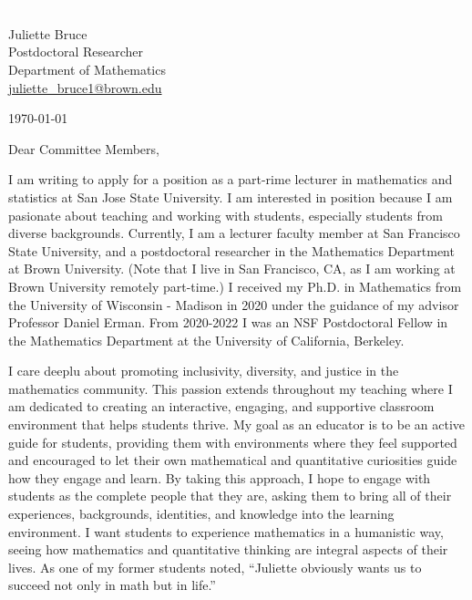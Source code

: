\documentclass[11pt]{article}
\begin{document}
\section*{}

\noindent
\begin{minipage}{0.99\textwidth}
\begin{minipage}{0.69\textwidth}
\textcolor{white}{.}
\end{minipage}
\begin{minipage}{0.29\textwidth}
{
Juliette Bruce \\
Postdoctoral Researcher \\
Department of Mathematics \\
\href{mailto:juliette\_bruce1@brown.edu}{juliette\_bruce1@brown.edu}
}

\vspace{12pt}
\today
\end{minipage}
\end{minipage}


\vspace{12pt}
\noindent
Dear Committee Members,

I am writing to apply for a position as a part-rime lecturer in mathematics and statistics at San Jose State University. I am interested in position because I am pasionate about teaching and working with students, especially students from diverse backgrounds. Currently, I am a lecturer faculty member at San Francisco State University, and a postdoctoral researcher in the Mathematics Department at Brown University. (Note that I live in San Francisco, CA, as I am working at Brown University remotely part-time.)  I received my Ph.D. in Mathematics from the University of Wisconsin - Madison in 2020 under the guidance of my advisor Professor Daniel Erman. From 2020-2022 I was an NSF Postdoctoral Fellow in the Mathematics Department at the University of California, Berkeley.

I care deeplu about promoting inclusivity, diversity, and justice in the mathematics community. This passion extends throughout my teaching where I am dedicated to creating an interactive, engaging, and supportive classroom environment that helps students thrive. My goal as an educator is to be an active guide for students, providing them with environments where they feel supported and encouraged to let their own mathematical and quantitative curiosities guide how they engage and learn. By taking this approach, I hope to engage with students as the complete people that they are, asking them to bring all of their experiences, backgrounds, identities, and knowledge into the learning environment. I want students to experience mathematics in a humanistic way, seeing how mathematics and quantitative thinking are integral aspects of their lives. As one of my former students noted, ``Juliette obviously wants us to succeed not only in math but in life.''
\end{document}
